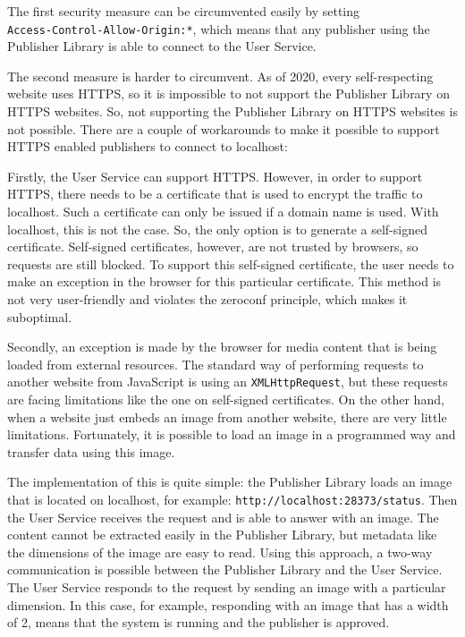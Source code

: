 The first security measure can be circumvented easily by setting \\\texttt{Access-Control-Allow-Origin:*}, which means that any publisher using the Publisher Library is able to connect to the User Service. 

The second measure is harder to circumvent. As of 2020, every self-respecting website uses HTTPS, so it is impossible to not support the Publisher Library on HTTPS websites. So, not supporting the Publisher Library on HTTPS websites is not possible. There are a couple of workarounds to make it possible to support HTTPS enabled publishers to connect to localhost:

 
Firstly, the User Service can support HTTPS. However, in order to support HTTPS, there needs to be a certificate that is used to encrypt the traffic to localhost. Such a certificate can only be issued if a domain name is used. With localhost, this is not the case. So, the only option is to generate a self-signed certificate. Self-signed certificates, however, are not trusted by browsers, so requests are still blocked. To support this self-signed certificate, the user needs to make an exception in the browser for this particular certificate. This method is not very user-friendly and violates the zeroconf principle, which makes it suboptimal.

Secondly, an exception is made by the browser for media content that is being loaded from external resources. The standard way of performing requests to another website from Java\-Script is using an \texttt{XMLHttpRequest}, but these requests are facing limitations like the one on self-signed certificates. On the other hand, when a website just embeds an image from another website, there are very little limitations. Fortunately, it is possible to load an image in a programmed way and transfer data using this image.

The implementation of this is quite simple: the Publisher Library loads an image that is located on localhost, for example: \texttt{http://localhost:28373/status}. Then the User Service receives the request and is able to answer with an image. The content cannot be extracted easily in the Publisher Library, but metadata like the dimensions of the image are easy to read. Using this approach, a two-way communication is possible between the Publisher Library and the User Service. The User Service responds to the request by sending an image with a particular dimension. In this case, for example, responding with an image that has a width of 2, means that the system is running and the publisher is approved.


